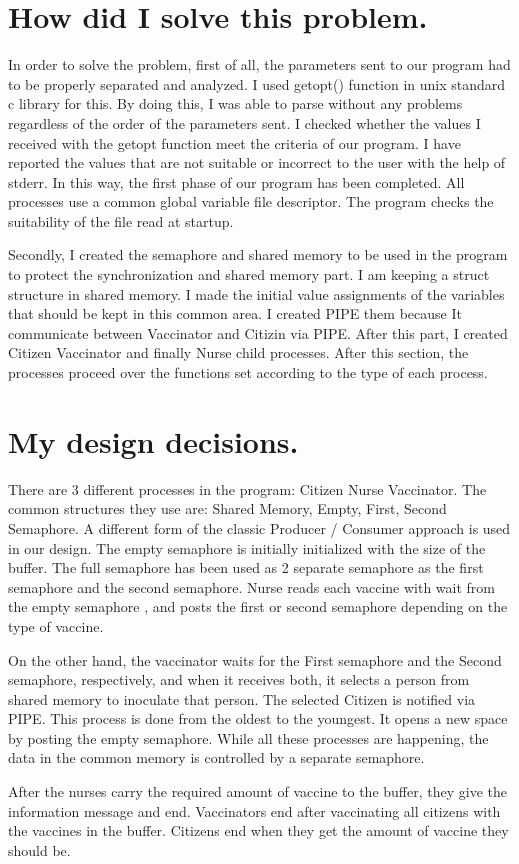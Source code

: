 \documentclass{article}
\begin{document}
\section{How did I solve this problem.}
\quad In order to solve the problem, first of all, the parameters sent to our program had to be properly separated and analyzed. I used getopt() function in unix standard c library for this. By doing this, I was able to parse without any problems regardless of the order of the parameters sent. I checked whether the values I received with the getopt function meet the criteria of our program. I have reported the values that are not suitable or incorrect to the user with the help of stderr. In this way, the first phase of our program has been completed. All processes use a common global variable file descriptor. The program checks the suitability of the file read at startup.
\par Secondly, I created the semaphore and shared memory to be used in the program to protect the synchronization and shared memory part. I am keeping a struct structure in shared memory. I made the initial value assignments of the variables that should be kept in this common area. I created PIPE them because It communicate between Vaccinator and Citizin via PIPE. After this part, I created Citizen Vaccinator and finally Nurse child processes. After this section, the processes proceed over the functions set according to the type of each process.\\


\section{My design decisions.}
 \quad There are 3 different processes in the program: Citizen Nurse Vaccinator. The common structures they use are: Shared Memory, Empty, First, Second Semaphore. A different form of the classic Producer / Consumer approach is used in our design. The empty semaphore is initially initialized with the size of the buffer. The full semaphore has been used as 2 separate semaphore as the first semaphore and the second semaphore. Nurse reads each vaccine with wait from the empty semaphore , and posts the first or second semaphore depending on the type of vaccine. 
 \par On the other hand, the vaccinator waits for the First semaphore and the Second semaphore, respectively, and when it receives both, it selects a person from shared memory to inoculate that person. The selected Citizen is notified via PIPE. This process is done from the oldest to the youngest. It opens a new space by posting the empty semaphore. While all these processes are happening, the data in the common memory is controlled by a separate semaphore.
 \par After the nurses carry the required amount of vaccine to the buffer, they give the information message and end. Vaccinators end after vaccinating all citizens with the vaccines in the buffer. Citizens end when they get the amount of vaccine they should be.\\
\newpage
\end{document}
